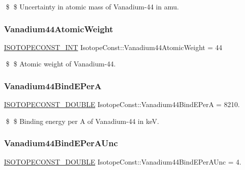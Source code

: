 \$ \$ Uncertainty in atomic mass of Vanadium-\/44 in amu. \mbox{\label{group___isotope_const-_vanadium-_v44_ga697b5b9fc43e3a2f0d2c787ecf64255e}} 
\subsubsection{\texorpdfstring{Vanadium44\+Atomic\+Weight}{Vanadium44AtomicWeight}}
{\footnotesize\ttfamily \mbox{\hyperlink{group___isotope_const-_macros_ga5f18360b3e99483a35c32d789e62621c}{I\+S\+O\+T\+O\+P\+E\+C\+O\+N\+S\+T\+\_\+\+I\+NT}} Isotope\+Const\+::\+Vanadium44\+Atomic\+Weight = 44}

\$ \$ Atomic weight of Vanadium-\/44. \mbox{\label{group___isotope_const-_vanadium-_v44_ga2ffd73d9863d8e00a72fc520fcd9aaf6}} 
\subsubsection{\texorpdfstring{Vanadium44\+Bind\+E\+PerA}{Vanadium44BindEPerA}}
{\footnotesize\ttfamily \mbox{\hyperlink{group___isotope_const-_macros_ga8f45a7272ce02c0b4c65c44636ed719a}{I\+S\+O\+T\+O\+P\+E\+C\+O\+N\+S\+T\+\_\+\+D\+O\+U\+B\+LE}} Isotope\+Const\+::\+Vanadium44\+Bind\+E\+PerA = 8210.}

\$ \$ Binding energy per A of Vanadium-\/44 in keV. \mbox{\label{group___isotope_const-_vanadium-_v44_ga2a7f44ed7fed34c188bbd0e17d5c0b08}} 
\subsubsection{\texorpdfstring{Vanadium44\+Bind\+E\+Per\+A\+Unc}{Vanadium44BindEPerAUnc}}
{\footnotesize\ttfamily \mbox{\hyperlink{group___isotope_const-_macros_ga8f45a7272ce02c0b4c65c44636ed719a}{I\+S\+O\+T\+O\+P\+E\+C\+O\+N\+S\+T\+\_\+\+D\+O\+U\+B\+LE}} Isotope\+Const\+::\+Vanadium44\+Bind\+E\+Per\+A\+Unc = 4.}

